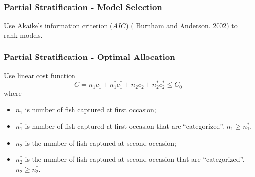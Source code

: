 \documentclass{beamer}
\begin{document}
\begin{frame} \frametitle{Partial Stratification - Model Selection}
Use Akaike's information criterion ($AIC$) ( Burnham and Anderson, 2002) to rank models.\\[2mm]
\end{frame}


\begin{frame}\frametitle{Partial Stratification - Optimal Allocation}

Use linear cost function
$$
C = n_{1} c_{1}  + n_{1}^{*} c_{1}^{*} +  n_{2} c_{2}  + n_{2}^{*} c_{2}^{*} \leq C_{0}
$$
where
\begin{itemize}
\item $n_1$ is number of fish captured at first occasion;
\item $n_1^*$ is number of fish captured at first occasion that are ``categorized''. $n_1 \geq n_1^*$.
\item $n_2$ is the number  of fish captured at second occasion;
\item $n_2^*$ is the number of fish captured at second occasion that are ``categorized''. $n_2 \geq n_2^*$.
\end{itemize}

\end{frame}
\end{document}
